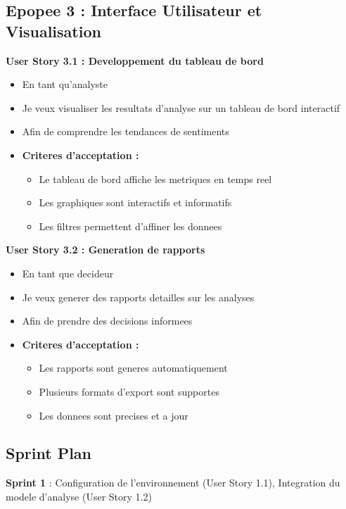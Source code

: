 \subsection{Epopee 3 : Interface Utilisateur et Visualisation}

\textbf{User Story 3.1 : Developpement du tableau de bord}
\begin{itemize}
    \item En tant qu'analyste
    \item Je veux visualiser les resultats d'analyse sur un tableau de bord interactif
    \item Afin de comprendre les tendances de sentiments
    \item \textbf{Criteres d'acceptation :}
    \begin{itemize}
        \item Le tableau de bord affiche les metriques en temps reel
        \item Les graphiques sont interactifs et informatifs
        \item Les filtres permettent d'affiner les donnees
    \end{itemize}
\end{itemize}

\textbf{User Story 3.2 : Generation de rapports}
\begin{itemize}
    \item En tant que decideur
    \item Je veux generer des rapports detailles sur les analyses
    \item Afin de prendre des decisions informees
    \item \textbf{Criteres d'acceptation :}
    \begin{itemize}
        \item Les rapports sont generes automatiquement
        \item Plusieurs formats d'export sont supportes
        \item Les donnees sont precises et a jour
    \end{itemize}
\end{itemize}

\subsection{Sprint Plan}

\textbf{Sprint 1} : Configuration de l'environnement (User Story 1.1), Integration du modele d'analyse (User Story 1.2)

